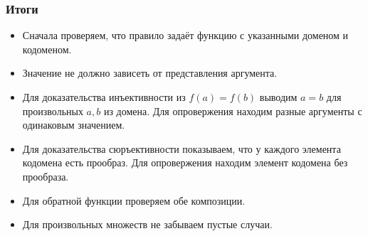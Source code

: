 \documentclass[10pt]{beamer}
\begin{document}
\begin{frame}
    \frametitle{Итоги}
    \begin{itemize}
        \item Сначала проверяем, что правило задаёт функцию с указанными доменом и кодоменом.
        \item Значение не должно зависеть от представления аргумента.
        \item Для доказательства инъективности из $f(a)=f(b)$ выводим $a=b$ для произвольных $a,b$ из домена. Для опровержения находим разные аргументы с одинаковым значением.
        \item Для доказательства сюръективности показываем, что у каждого элемента кодомена есть прообраз. Для опровержения находим элемент кодомена без прообраза.
        \item Для обратной функции проверяем обе композиции.
        \item Для произвольных множеств не забываем пустые случаи.
    \end{itemize}
\end{frame}
\end{document}
